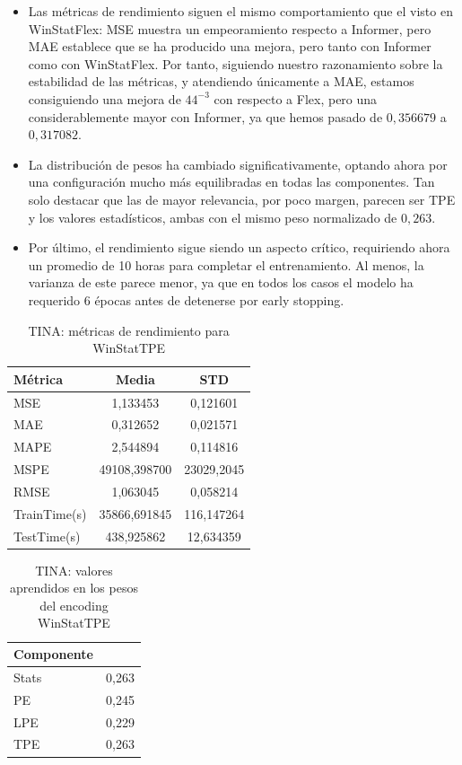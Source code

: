 \begin{itemize}
	\item Las métricas de rendimiento siguen el mismo comportamiento que el visto en WinStatFlex: MSE muestra un empeoramiento respecto a Informer, pero MAE establece que se ha producido una mejora, pero tanto con Informer como con WinStatFlex. Por tanto, siguiendo nuestro razonamiento sobre la estabilidad de las métricas, y atendiendo únicamente a MAE, estamos consiguiendo una mejora de $44^{-3}$ con respecto a Flex, pero una considerablemente mayor con Informer, ya que hemos pasado de $0,356679$ a $0,317082$.
	
	\item La distribución de pesos ha cambiado significativamente, optando ahora por una configuración mucho más equilibradas en todas las componentes. Tan solo destacar que las de mayor relevancia, por poco margen, parecen ser TPE y los valores estadísticos, ambas con el mismo peso normalizado de $0,263$.
	
	\item Por último, el rendimiento sigue siendo un aspecto crítico, requiriendo ahora un promedio de 10 horas para completar el entrenamiento. Al menos, la varianza de este parece menor, ya que en todos los casos el modelo ha requerido 6 épocas antes de detenerse por early stopping.
\end{itemize}


\begin{table}[!ht]
	\centering
	\begin{tabular}{l|c|c}
		\toprule
		Métrica & Media & STD \\
		\midrule
		MSE & 1,133453 & 0,121601 \\
		MAE & 0,312652 & 0,021571 \\
		MAPE & 2,544894 & 0,114816 \\
		MSPE & 49108,398700 & 23029,2045 \\
		RMSE & 1,063045 & 0,058214 \\
		TrainTime(s) & 35866,691845 & 116,147264 \\
		TestTime(s) & 438,925862 & 12,634359 \\
		\bottomrule
	\end{tabular}
	\caption{TINA: métricas de rendimiento para WinStatTPE}
	\label{tinatpe}
\end{table}

\begin{table}[!ht]
	\centering
	\begin{tabular}{l|N}
		\toprule
		Componente &  \\
		\midrule
		Stats & 0,263 \\
		PE & 0,245 \\
		LPE & 0,229 \\
		TPE & 0,263 \\
		\bottomrule
	\end{tabular}
	\caption{TINA: valores aprendidos en los pesos del encoding WinStatTPE}
	\label{tinatpepesos}
\end{table}

